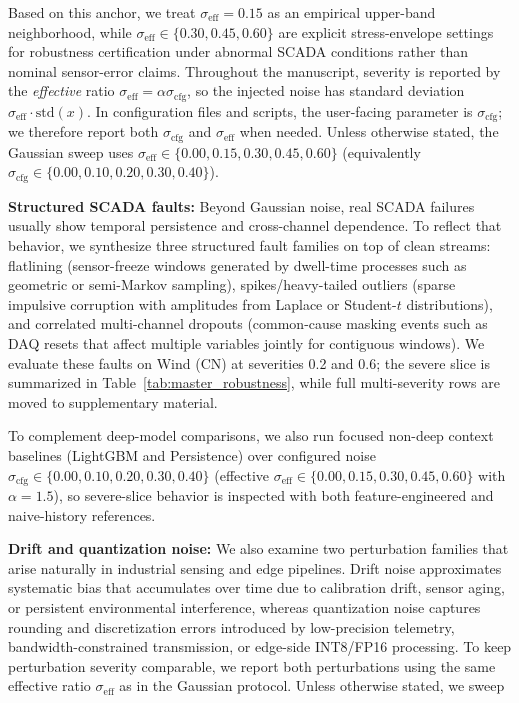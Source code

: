 ﻿\documentclass[review,1p,times]{elsarticle}
\begin{document}
Based on this anchor, we treat $\sigma_{\mathrm{eff}}=0.15$ as an empirical upper-band neighborhood, while $\sigma_{\mathrm{eff}}\in\{0.30,0.45,0.60\}$ are explicit stress-envelope settings for robustness certification under abnormal SCADA conditions rather than nominal sensor-error claims. Throughout the manuscript, severity is reported by the \emph{effective} ratio $\sigma_{\mathrm{eff}}=\alpha\sigma_{\mathrm{cfg}}$, so the injected noise has standard deviation $\sigma_{\mathrm{eff}}\cdot\mathrm{std}(x)$. In configuration files and scripts, the user-facing parameter is $\sigma_{\mathrm{cfg}}$; we therefore report both $\sigma_{\mathrm{cfg}}$ and $\sigma_{\mathrm{eff}}$ when needed. Unless otherwise stated, the Gaussian sweep uses $\sigma_{\mathrm{eff}}\in\{0.00,0.15,0.30,0.45,0.60\}$ (equivalently $\sigma_{\mathrm{cfg}}\in\{0.00,0.10,0.20,0.30,0.40\}$).

\noindent\textbf{Structured SCADA faults:}
\label{subsubsec:robust_structured}
Beyond Gaussian noise, real SCADA failures usually show temporal persistence and cross-channel dependence. To reflect that behavior, we synthesize three structured fault families on top of clean streams: flatlining (sensor-freeze windows generated by dwell-time processes such as geometric or semi-Markov sampling), spikes/heavy-tailed outliers (sparse impulsive corruption with amplitudes from Laplace or Student-$t$ distributions), and correlated multi-channel dropouts (common-cause masking events such as DAQ resets that affect multiple variables jointly for contiguous windows). We evaluate these faults on Wind (CN) at severities 0.2 and 0.6; the severe slice is summarized in Table~\ref{tab:master_robustness}, while full multi-severity rows are moved to supplementary material.

To complement deep-model comparisons, we also run focused non-deep context baselines (LightGBM and Persistence) over configured noise $\sigma_{\mathrm{cfg}}\in\{0.00,0.10,0.20,0.30,0.40\}$ (effective $\sigma_{\mathrm{eff}}\in\{0.00,0.15,0.30,0.45,0.60\}$ with $\alpha=1.5$), so severe-slice behavior is inspected with both feature-engineered and naive-history references.

\noindent\textbf{Drift and quantization noise:}
We also examine two perturbation families that arise naturally in industrial sensing and edge pipelines. Drift noise approximates systematic bias that accumulates over time due to calibration drift, sensor aging, or persistent environmental interference, whereas quantization noise captures rounding and discretization errors introduced by low-precision telemetry, bandwidth-constrained transmission, or edge-side INT8/FP16 processing. To keep perturbation severity comparable, we report both perturbations using the same effective ratio $\sigma_{\mathrm{eff}}$ as in the Gaussian protocol. Unless otherwise stated, we sweep
\end{document}
